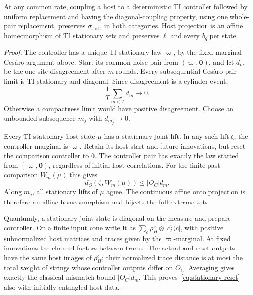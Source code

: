 \begin{proposition}\label{prop:stationary-diagonal}
At any common rate, coupling a host to a deterministic TI
controller followed by uniform replacement and having the
diagonal-coupling property, using one whole-pair replacement,
preserves \(\sigma_{\mathrm{stat}}\), in both categories.
Host projection is an affine homeomorphism of TI stationary sets
and preserves \(\ell\) and every \(b_q\) per state.
\end{proposition}
\begin{proof}
The controller has a unique TI stationary law \(\varpi\), by the
fixed-marginal Ces\`aro argument above. Start its common-noise
pair from \((\varpi,\mathbf0)\), and let \(d_m\) be the one-site
disagreement after \(m\) rounds. Every subsequential Ces\`aro
pair limit is TI stationary and diagonal. Since disagreement
is a cylinder event,
\[
 \frac1T\sum_{m<T}d_m\longrightarrow0.
\]
Otherwise a compactness limit would have positive disagreement.
Choose an unbounded subsequence \(m_j\) with \(d_{m_j}\to0\).

Every TI stationary host state \(\mu\) has a stationary joint
lift. In any such lift \(\zeta\), the controller marginal is
\(\varpi\). Retain its host start and future innovations, but
reset the comparison controller to \(\mathbf0\).
The controller pair has exactly the law started from
\((\varpi,\mathbf0)\), regardless of initial host correlations.
For the finite-past comparison \(W_m(\mu)\) this gives
\begin{equation}\label{eq:stationary-reset}
 d_O(\zeta,W_m(\mu))\le |O_C|d_m.
\end{equation}
Along \(m_j\), all stationary lifts of \(\mu\) agree.
The continuous affine onto projection is therefore an affine
homeomorphism and bijects the full extreme sets.

Quantumly, a stationary joint state is diagonal on the
measure-and-prepare controller. On a finite input cone write it
as
\(\sum_c\rho_H^c\otimes|c\rangle\langle c|\), with positive
subnormalized host matrices and traces given by the
\(\varpi\)-marginal. At fixed innovations the channel factors
between tracks. The actual and reset outputs have the same host
images of \(\rho_H^c\); their normalized trace distance is at
most the total weight of strings whose controller outputs differ
on \(O_C\). Averaging gives exactly the classical mismatch
bound \(|O_C|d_m\). This proves~\eqref{eq:stationary-reset}
also with initially entangled host data.


\end{proof}
